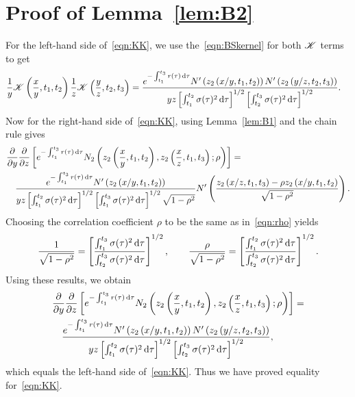 \section{Proof of Lemma~\ref{lem:B2}}
For the left-hand side of~\eqref{eqn:KK}, we use the~\eqref{eqn:BSkernel} for both $\mathscr K$ terms to get
			\begin{align*}
				\frac{1}{y}\mathscr K\left(\frac{x}{y},t_1,t_2\right)\frac{1}{z}\mathscr K\left(\frac{y}{z},t_2,t_3\right) &= \frac{e^{-\int_{t_1}^{t_3} r(\tau) \, \mathrm d\tau}N'\left(z_2\left( x/y,t_1,t_2 \right) \right)N'\left(z_2\left( y/z,t_2,t_3 \right) \right)}{yz\left[\int_{t_1}^{t_2} \sigma(\tau)^2 \, \mathrm d\tau\right]^{1/2}\left[ \int_{t_2}^{t_3} \sigma(\tau)^2 \, \mathrm d\tau\right]^{1/2}}.
			\end{align*}
		Now for the right-hand side of~\eqref{eqn:KK}, using Lemma~\ref{lem:B1} and the chain rule gives
			\begin{align*}
				&\frac{\partial}{\partial y}\frac{\partial}{\partial z}\left[ e^{-\int_{t_1}^{t_3} r(\tau) \,\mathrm d\tau} N_2\left(z_2\left( \frac{x}{y},t_1,t_2 \right), z_2\left( \frac{x}{z},t_1,t_3 \right); \rho \right) \right] = \\
				&\quad\frac{e^{-\int_{t_1}^{t_3} r(\tau) \, \mathrm d\tau}N'\left( z_2\left(x/y, t_1, t_2\right)\right)}{yz\left[\int_{t_1}^{t_2} \sigma(\tau)^2 \, \mathrm d\tau\right]^{1/2}\left[ \int_{t_1}^{t_3} \sigma(\tau)^2 \, \mathrm d\tau\right]^{1/2}\sqrt{1-\rho^2}}N'\left( \frac{z_2\left( x/z, t_1, t_3\right) - \rho z_2\left( x/y, t_1, t_2 \right)}{\sqrt{1-\rho^2}} \right).
			\end{align*}
		Choosing the correlation coefficient $\rho$ to be the same as in~\eqref{eqn:rho} yields
		\begin{equation*}
			\frac{1}{\sqrt{1-\rho^2}} = \left[ \frac{\int_{t_1}^{t_3} \sigma(\tau)^2 \, \mathrm d\tau}{\int_{t_2}^{t_3} \sigma(\tau)^2 \, \mathrm d\tau} \right]^{1/2}, \qquad \frac{\rho}{\sqrt{1-\rho^2}} = \left[ \frac{\int_{t_1}^{t_2} \sigma(\tau)^2 \, \mathrm d\tau}{\int_{t_2}^{t_3} \sigma(\tau)^2 \, \mathrm d\tau} \right]^{1/2}.
		\end{equation*}
		Using these results, we obtain
			\begin{align*}
				&\frac{\partial}{\partial y}\frac{\partial}{\partial z}\left[ e^{-\int_{t_1}^{t_3} r(\tau) \,\mathrm d\tau} N_2\left(z_2\left( \frac{x}{y},t_1,t_2 \right), z_2\left( \frac{x}{z},t_1,t_3 \right); \rho \right) \right] = \\
				&\quad \frac{e^{-\int_{t_1}^{t_3} r(\tau) \, \mathrm d\tau}N'\left(z_2\left( x/y,t_1,t_2 \right) \right)N'\left(z_2\left( y/z,t_2,t_3 \right) \right)}{yz\left[\int_{t_1}^{t_2} \sigma(\tau)^2 \, \mathrm d\tau\right]^{1/2}\left[ \int_{t_2}^{t_3} \sigma(\tau)^2 \, \mathrm d\tau\right]^{1/2}},
			\end{align*}
		which equals the left-hand side of~\eqref{eqn:KK}. Thus we have proved equality for~\eqref{eqn:KK}.
		
